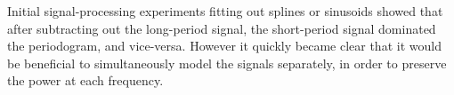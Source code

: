 \documentclass[12pt,twocolumn,tighten]{aastex62}
\begin{document}
Initial signal-processing experiments fitting out splines or sinusoids
showed that after subtracting out the long-period signal, the
short-period signal dominated the periodogram, and vice-versa.
However it quickly became clear that it would be beneficial to
simultaneously model the signals separately, in order to preserve the
power at each frequency.




% 
% 
% 
\end{document}
